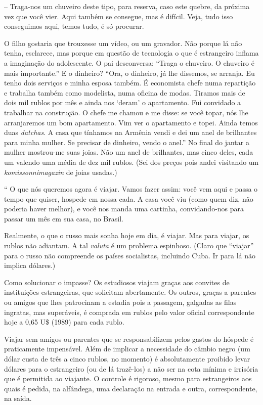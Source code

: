 -- Traga-nos um chuveiro deste tipo, para reserva, caso este quebre, da
próxima vez que você vier. Aqui também se consegue, mas é difícil. Veja,
tudo isso conseguimos aqui, temos tudo, é só procurar.

O filho gostaria que trouxesse um vídeo, ou um gravador. Não porque lá
não tenha, esclarece, mas porque em questão de tecnologia o que é
estrangeiro inflama a imaginação do adolescente. O pai desconversa:
``Traga o chuveiro. O chuveiro é mais importante.'' E o dinheiro? ``Ora,
o dinheiro, já lhe dissemos, se arranja. Eu tenho dois serviços e minha
esposa também. É economista chefe numa repartição e trabalha também como
modelista, numa oficina de modas. Tiramos mais de dois mil rublos por
mês e ainda nos `deram' o apartamento. Fui convidado a trabalhar na
construção. O chefe me chamou e me disse: se você topar, nós lhe
arranjaremos um bom apartamento. Vim ver o apartamento e topei. Ainda
temos duas \emph{datchas}. A casa que tínhamos na Armênia vendi e dei um
anel de brilhantes para minha mulher. Se precisar de dinheiro, vendo o
anel.'' No final do jantar a mulher mostrou-me suas joias. Não um anel
de brilhantes, mas cinco deles, cada um valendo uma média de dez mil
rublos. (Sei dos preços pois andei visitando um \emph{komissonnimagazin}
de joias usadas.)

`` O que nós queremos agora é viajar. Vamos fazer assim: você vem aqui e
passa o tempo que quiser, hospede em nossa cada. A casa você viu (como
quem diz, não poderia haver melhor), e você nos manda uma cartinha,
convidando-nos para passar um mês em sua casa, no Brasil.

Realmente, o que o russo mais sonha hoje em dia, é viajar. Mas para
viajar, os rublos não adiantam. A tal \emph{valuta} é um problema
espinhoso. (Claro que ``viajar'' para o russo não compreende os países
socialistas, incluindo Cuba. Ir para lá não implica dólares.)

Como solucionar o impasse? Os estudiosos viajam graças aos convites de
instituições estrangeiras, que solicitam abertamente. Os outros, graças
a parentes ou amigos que lhes patrocinam a estadia pois a passagem,
galgadas as filas ingratas, mas superáveis, é comprada em rublos pelo
valor oficial correspondente hoje a 0,65 U\$ (1989) para cada rublo.

Viajar sem amigos ou parentes que se responsabilizem pelos gastos do
hóspede é praticamente impensável. Além de implicar a necessidade do
câmbio negro (um dólar custa de três a cinco rublos, no momento) é
absolutamente proibido levar dólares para o estrangeiro (ou de lá
trazê-los) a não ser na cota mínima e irrisória que é permitida ao
viajante. O controle é rigoroso, mesmo para estrangeiros aos quais é
pedida, na alfândega, uma declaração na entrada e outra, correspondente,
na saída.


